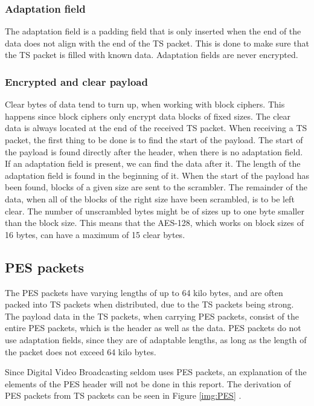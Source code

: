 \subsubsection{Adaptation field}
The adaptation field is a padding field that is only inserted when the 
end of the data does not align with the end of the TS packet. This is 
done to make sure that the TS packet is filled with known data. 
Adaptation fields are never encrypted. \cite[pp. 10--11]{DVB:2013}

\subsubsection{Encrypted and clear payload}
Clear bytes of data tend to turn up, when working with block ciphers. 
This happens since block ciphers only encrypt data blocks of fixed 
sizes. The clear data is always located at the end of the received 
TS packet. When receiving a TS packet, the first thing to be done is 
to find the start of the payload. The start of the payload is found 
directly after the header, when there is no adaptation field. If an 
adaptation field is present, we can find the data after it. The length 
of the adaptation field is found in the beginning of it. When the 
start of the payload has been found, blocks of a given size are sent 
to the scrambler. The remainder of the data, when all of the blocks 
of the right size have been scrambled, is to be left clear. The number 
of unscrambled bytes might be of sizes up to one byte smaller than the 
block size. This means that the AES-128, which works on block sizes of 
16 bytes, can have a maximum of 15 clear bytes. 
\cite[pp. 10--11]{DVB:2013}

\subsection{PES packets}
The PES packets have varying lengths of up to 64 kilo bytes, and are 
often packed into TS packets when distributed, due to the TS packets 
being strong. The payload data in the TS packets, when carrying PES 
packets, consist of the entire PES packets, which is the header as 
well as the data. PES packets do not use adaptation fields, since 
they are of adaptable lengths, as long as the length of the packet 
does not exceed 64 kilo bytes.

Since Digital Video Broadcasting seldom uses PES packets, an 
explanation of the elements of the PES header will not be done in 
this report. The derivation of PES packets from TS packets can be 
seen in Figure \ref{img:PES} \citep[p. 9]{ETR:289}.

